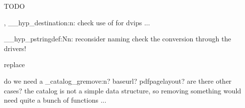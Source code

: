 TODO

\hyper@anchor, \__hyp_destination:n:
check use of \@pdfviewparams for dvips ...


\__hyp_pstringdef:Nn: reconsider naming
check the conversion through the drivers!

replace \hyper@chars

do we need a \pdf_catalog_gremove:n? 
  baseurl? 
  pdfpagelayout? 
  are there other cases?
the catalog is not a simple data structure, so removing something would need
quite a bunch of functions ...



